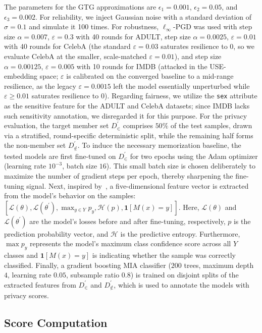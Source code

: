 \documentclass[acmsmall]{acmart}
\begin{document}
The parameters for the GTG approximations are $\epsilon_1=0.001$, $\epsilon_2=0.05$, and $\epsilon_3=0.002$. For reliability, we inject Gaussian noise with a standard deviation of $\sigma=0.1$ and simulate it 100 times. For robustness, $\ell_\infty$-PGD was used with step size $\alpha=0.007$, $\varepsilon=0.3$ with 40 rounds for ADULT, step size $\alpha=0.0025$, $\varepsilon=0.01$ with 40 rounds for CelebA (the standard $\varepsilon=0.03$ saturates resilience to $0$, so we evaluate CelebA at the smaller, scale-matched $\varepsilon=0.01$), and step size $\alpha=0.00125$, $\varepsilon=0.005$ with 10 rounds for IMDB (attacked in the USE-embedding space; $\varepsilon$ is calibrated on the converged baseline to a mid-range resilience, as the legacy $\varepsilon=0.0015$ left the model essentially unperturbed while $\varepsilon\geq0.01$ saturates resilience to $0$). Regarding fairness, we utilize the \texttt{sex} attribute as the sensitive feature for the ADULT and CelebA datasets; since IMDB lacks such sensitivity annotation, we disregarded it for this purpose. For the privacy evaluation, the target member set $D^\prime_\in$ comprises $50\%$ of the test samples, drawn via a stratified, round-specific deterministic split, while the remaining half forms the non-member set $D^\prime_{\not\in}$. To induce the necessary memorization baseline, the tested models are first fine-tuned on $D^\prime_\in$ for two epochs using the Adam optimizer (learning rate $10^{-3}$, batch size $16$). This small batch size is chosen deliberately to maximize the number of gradient steps per epoch, thereby sharpening the fine-tuning signal. Next, inspired by~\cite{yeom2018privacy}, a five-dimensional feature vector is extracted from the model's behavior on the samples: $[\mathcal{L}(\theta), \mathcal{L}(\theta^\prime), \max_{y\in Y} p_y, \mathcal{H}(p), \mathbf{1}[M(x)=y]]$. Here, $\mathcal{L}(\theta)$ and $\mathcal{L}(\theta^\prime)$ are the model's losses before and after fine-tuning, respectively, $p$ is the prediction probability vector, and $\mathcal{H}$ is the predictive entropy. Furthermore, $\max p_y$ represents the model's maximum class confidence score across all $Y$ classes and $\mathbf{1}[M(x)=y]$ is indicating whether the sample was correctly classified. Finally, a gradient boosting MIA classifier ($200$ trees, maximum depth $4$, learning rate $0.05$, subsample ratio $0.8$) is trained on disjoint splits of the extracted features from $D^\prime_\in$ and $D^\prime_{\not\in}$, which is used to annotate the models with privacy scores. 

\subsection{Score Computation}
\end{document}
